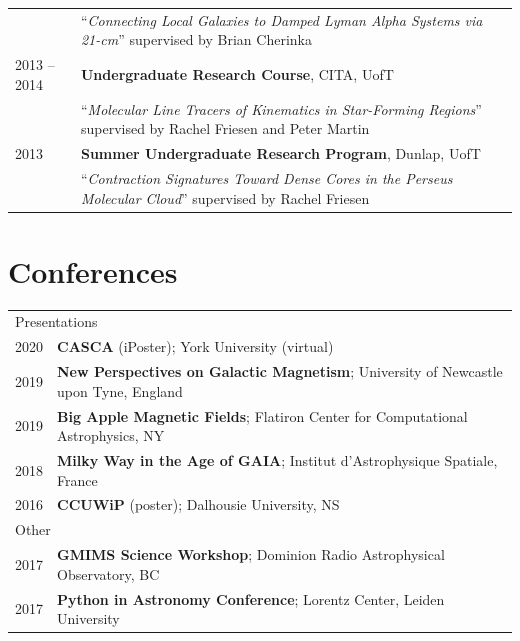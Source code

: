 \documentclass[10pt]{res} %
\begin{document}
\begin{resume}
\begin{table}[h!]
\begin{tabularx}{\textwidth}{ @{} p{6.5em} X @{} }
         & ``\textit{Connecting Local Galaxies to Damped Lyman Alpha Systems via 21-cm}'' supervised by Brian Cherinka \\
2013 -- 2014 &\textbf{Undergraduate Research Course}, CITA, UofT \\
                     & ``\textit{Molecular Line Tracers of Kinematics in Star-Forming Regions}'' supervised by Rachel Friesen and Peter Martin \\
2013 & \textbf{Summer Undergraduate Research Program}, Dunlap, UofT \\
         & ``\textit{Contraction Signatures Toward Dense Cores in the Perseus Molecular Cloud}'' supervised by Rachel Friesen
\end{tabularx}
\end{table}


\section{\Large Conferences}
\vspace{-5pt} %
\noindent\makebox[\linewidth]{\rule{\textwidth}{0.4pt}}
\vspace{-20pt} %

\begin{table}[h!]
\begin{tabularx}{\textwidth}{lX}
\multicolumn{2}{l}{ \rule{0pt}{3ex} \large \hspace{-12pt} Presentations \dotfill \rule[-1.2ex]{0pt}{0pt}} \\
2020 & \textbf{CASCA} (iPoster); York University (virtual) \\
2019 & \textbf{New Perspectives on Galactic Magnetism}; University of Newcastle upon Tyne, England \\
2019 & \textbf{Big Apple Magnetic Fields}; Flatiron Center for Computational Astrophysics, NY \\
2018 & \textbf{Milky Way in the Age of GAIA}; Institut d'Astrophysique Spatiale, France \\
2016 & \textbf{CCUWiP} (poster); Dalhousie University, NS \\
\multicolumn{2}{l}{ \rule{0pt}{3ex} \large \hspace{-12pt} Other \dotfill \rule[-1.2ex]{0pt}{0pt}}  \\
2017 & \textbf{GMIMS Science Workshop}; Dominion Radio Astrophysical Observatory, BC \\
2017 & \textbf{Python in Astronomy Conference}; Lorentz Center, Leiden University 
\end{tabularx}
\end{table}


\end{resume}
\end{document}
